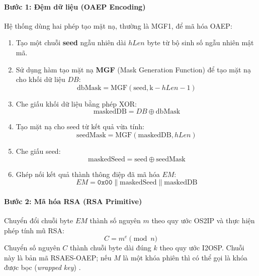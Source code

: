 \paragraph{Bước 1: Đệm dữ liệu (OAEP Encoding)}
Hệ thống dùng hai phép tạo mặt nạ, thường là MGF1, để mã hóa OAEP:
\begin{enumerate}
    \item Tạo một chuỗi \textbf{seed} ngẫu nhiên dài $hLen$ byte từ bộ sinh số ngẫu nhiên mật mã.
    \item Sử dụng hàm tạo mặt nạ \textbf{MGF} (Mask Generation Function) để tạo mặt nạ cho khối dữ liệu $DB$:
    \begin{equation}
        \text{dbMask} = \text{MGF}(\text{seed}, \text{k} - hLen - 1)
    \end{equation}
    \item Che giấu khối dữ liệu bằng phép XOR:
    \begin{equation}
        \text{maskedDB} = DB \oplus \text{dbMask}
    \end{equation}
    \item Tạo mặt nạ cho seed từ kết quả vừa tính:
    \begin{equation}
        \text{seedMask} = \text{MGF}(\text{maskedDB}, hLen)
    \end{equation}
    \item Che giấu seed:
    \begin{equation}
        \text{maskedSeed} = \text{seed} \oplus \text{seedMask}
    \end{equation}
    \item Ghép nối kết quả thành thông điệp đã mã hóa $EM$:
    \begin{equation}
        EM = \texttt{0x00} \parallel \text{maskedSeed} \parallel \text{maskedDB}
    \end{equation}
\end{enumerate}

\paragraph{Bước 2: Mã hóa RSA (RSA Primitive)}
Chuyển đổi chuỗi byte $EM$ thành số nguyên $m$ theo quy ước OS2IP và thực hiện phép tính mũ RSA:
\begin{equation}
    C = m^e \pmod n
\end{equation}
Chuyển số nguyên $C$ thành chuỗi byte dài đúng $k$ theo quy ước I2OSP. Chuỗi này là bản mã RSAES-OAEP; nếu $M$ là một khóa phiên thì có thể gọi là khóa được bọc (\textit{wrapped key}) \cite{rsa8017}.

